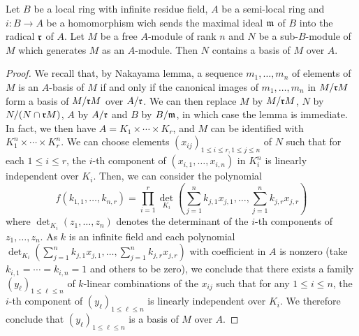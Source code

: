 \begin{lemma}\label{semilocal ring submodule generating contain basis}
Let $B$ be a local ring with infinite residue field, $A$ be a semi-local ring and $i:B\to A$ be a homomorphism wich sends the maximal ideal $\mathfrak{m}$ of $B$ into the radical $\mathfrak{r}$ of $A$. Let $M$ be a free $A$-module of rank $n$ and $N$ be a sub-$B$-module of $M$ which generates $M$ as an $A$-module. Then $N$ contains a basis of $M$ over $A$.
\end{lemma}
\begin{proof}
We recall that, by Nakayama lemma, a sequence $m_1,\dots,m_n$ of elements of $M$ is an $A$-basis of $M$ if and only if the canonical images of $m_1,\dots,m_n$ in $M/\mathfrak{r} M$ form a basis of $M/\mathfrak{r} M$ over $A/\mathfrak{r}$. We can then replace $M$ by $M/\mathfrak{r} M$, $N$ by $N/(N\cap\mathfrak{r} M)$, $A$ by $A/\mathfrak{r}$ and $B$ by $B/\mathfrak{m}$, in which case the lemma is immediate. In fact, we then have $A=K_1\times\cdots\times K_r$, and $M$ can be identified with $K_1^n\times\cdots\times K_r^n$. We can choose elements $(x_{ij})_{1\leq i\leq r,1\leq j\leq n}$ of $N$ such that for each $1\leq i\leq r$, the $i$-th component of $(x_{i,1},\dots,x_{i,n})$ in $K_i^n$ is linearly independent over $K_i$. Then, we can consider the polynomial
\[f(k_{1,1},\dots,k_{n,r})=\prod_{i=1}^{r}\det_{K_i}(\sum_{j=1}^{n}k_{j,1}x_{j,1},\dots,\sum_{j=1}^{n}k_{j,r}x_{j,r})\]
where $\det_{K_i}(z_1,\dots,z_n)$ denotes the determinant of the $i$-th components of $z_1,\dots,z_n$. As $k$ is an infinite field and each polynomial $\det_{K_i}(\sum_{j=1}^{n}k_{j,1}x_{j,1},\dots,\sum_{j=1}^{n}k_{j,r}x_{j,r})$ with coefficient in $A$ is nonzero (take $k_{i,1}=\cdots=k_{i,n}=1$ and others to be zero), we conclude that there exists a family $(y_\ell)_{1\leq\ell\leq n}$ of $k$-linear combinations of the $x_{ij}$ such that for any $1\leq i\leq n$, the $i$-th component of $(y_\ell)_{1\leq\ell\leq n}$ is linearly independent over $K_i$. We therefore conclude that $(y_\ell)_{1\leq\ell\leq n}$ is a basis of $M$ over $A$.
\end{proof}

